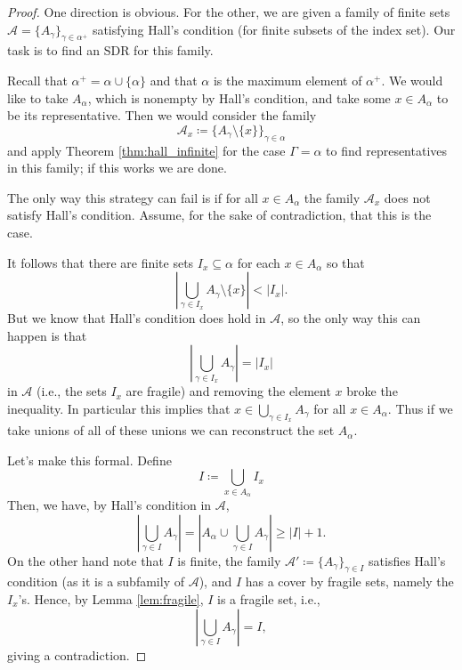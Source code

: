 \documentclass{article}
\theoremstyle{definition}
\theoremstyle{plain}
\theoremstyle{definition}
\begin{document}
	\begin{proof}
		One direction is obvious. For the other, we are given a family of finite sets $\mathcal{A}=\{A_{\gamma}\}_{\gamma\in\alpha^+}$ satisfying Hall's condition (for finite subsets of the index set). Our task is to find an SDR for this family.
		
		Recall that $\alpha^+ = \alpha \cup \{\alpha\}$ and that $\alpha$ is the maximum element of $\alpha^+$. We would like to take $A_{\alpha}$, which is nonempty by Hall's condition, and take some $x\in A_{\alpha}$ to be its representative. Then we would consider the family
		\[
			\mathcal{A}_x \coloneqq \{A_\gamma \setminus \{x\}\}_{\gamma \in \alpha}
		\]
		and apply Theorem \ref{thm:hall_infinite} for the case $\Gamma = \alpha$ to find representatives in this family; if this works we are done.
		
		The only way this strategy can fail is if for all $x\in A_\alpha$ the family $\mathcal{A}_x$ does not satisfy Hall's condition. Assume, for the sake of contradiction, that this is the case.
		
		It follows that there are finite sets $I_x \subseteq \alpha$ for each $x\in A_\alpha$ so that 
		\[
		\left|\bigcup_{\gamma\in I_x} A_{\gamma}\setminus\{x\}\right| < |I_x|.
		\]
		But we know that Hall's condition does hold in $\mathcal{A}$, so the only way this can happen is that 
		\begin{equation*}\label{eq:s_x}
			\left|\bigcup_{\gamma\in I_x} A_{\gamma}\right| = |I_x|
		\end{equation*}
		in $\mathcal{A}$ (i.e., the sets $I_x$ are fragile) and removing the element $x$ broke the inequality. In particular this implies that $x\in \bigcup_{\gamma\in I_x} A_\gamma$ for all $x\in A_\alpha$. Thus if we take unions of all of these unions we can reconstruct the set $A_\alpha$. 
		
		Let's make this formal. Define
		\[
		I \coloneqq \bigcup_{x\in A_\alpha} I_x
		\]	
		Then, we have, by Hall's condition in $\mathcal{A}$,
		\[
		\left|\bigcup_{\gamma\in I}A_\gamma\right| = \left|A_\alpha \cup \bigcup_{\gamma\in I}A_\gamma\right| \geq |I| + 1.
		\]	 
		On the other hand note that $I$ is finite, the family $\mathcal{A}' \coloneqq \{A_\gamma\}_{\gamma\in I}$ satisfies Hall's condition (as it is a subfamily of $\mathcal{A}$), and $I$ has a cover by fragile sets, namely the $I_x$'s. Hence, by Lemma \ref{lem:fragile}, $I$ is a fragile set, i.e.,
		\[
			\left|\bigcup_{\gamma\in I}A_\gamma\right| = I,
		\]
		giving a contradiction.
	\end{proof}
\end{document}
